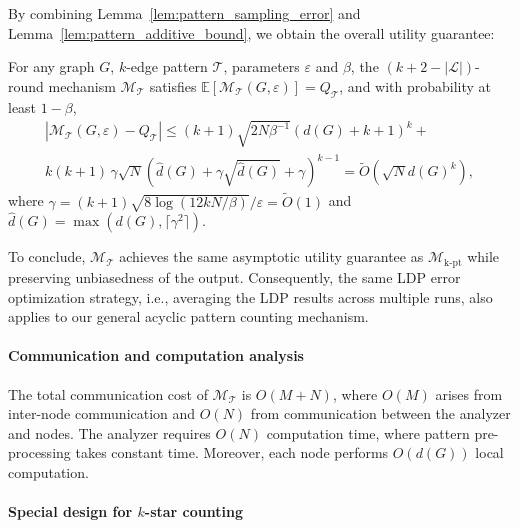 By combining Lemma~\ref{lem:pattern_sampling_error} and Lemma~\ref{lem:pattern_additive_bound}, we obtain the overall utility guarantee:



\begin{theorem}
\label{the:pattern_bound}
For any graph $G$, $k$-edge pattern $\mathcal{T}$, parameters $\varepsilon$ and $\beta$,
the $(k + 2 - |\mathcal{L}|)$-round mechanism $\mathcal{M}_\mathcal{T}$ satisfies 
$\mathbb{E}[\mathcal{M}_\mathcal{T}(G, \varepsilon)] = Q_\mathcal{T}$,
and with probability at least $1 - \beta$,
\begin{align*}
    |\mathcal{M}_\mathcal{T}(G, \varepsilon) - Q_\mathcal{T}| 
    \leq
    (k+1) \sqrt{2N\beta^{-1}}(d(G)+k+1)^k +\\
      {k(k+1)} \,
    \gamma
    \sqrt{N}
    (\hat{d}(G) + \gamma \sqrt{\hat{d}(G)} + \gamma)^{k-1} 
    = \tilde{O}(\sqrt{N} d(G)^{k}),
\end{align*}
where $\gamma = (k{+}1)\sqrt{8\log(12kN/\beta)}/\varepsilon = \tilde{O}(1) $ and $\hat{d}(G) = \max(d(G), \lceil \gamma^2 \rceil)$.
\end{theorem}





To conclude, $\mathcal{M}_\mathcal{T}$ achieves the same asymptotic utility guarantee as $\mathcal{M}_{\mathrm{k\text{-}pt}}$ while preserving unbiasedness of the output. 
{Consequently, the same LDP error optimization strategy, i.e., averaging the LDP results across multiple runs, also applies to our general acyclic pattern counting mechanism.
}




\paragraph{Communication and computation analysis}

The total communication cost of $\mathcal{M}_\mathcal{T}$ is $O(M +N)$, where $O(M)$ arises from inter-node communication and $O(N)$ from communication between the analyzer and nodes. 
The analyzer requires $O(N)$ computation time, where pattern pre-processing takes constant time. 
Moreover, each node performs $O(d(G))$ local computation.

\paragraph{Special design for $k$-star counting} 

